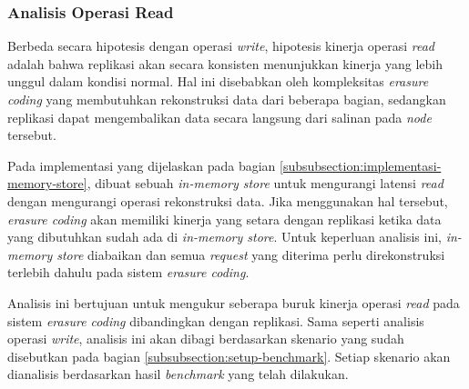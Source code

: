 
\subsubsection{Analisis Operasi Read}
\label{subsubsection:analisis-operasi-read}

Berbeda secara hipotesis dengan operasi \textit{write}, hipotesis kinerja operasi \textit{read} adalah bahwa replikasi akan secara konsisten menunjukkan kinerja yang lebih unggul dalam kondisi normal. Hal ini disebabkan oleh kompleksitas \textit{erasure coding} yang membutuhkan rekonstruksi data dari beberapa bagian, sedangkan replikasi dapat mengembalikan data secara langsung dari salinan pada \textit{node} tersebut.

Pada implementasi yang dijelaskan pada bagian \ref{subsubsection:implementasi-memory-store}, dibuat sebuah \textit{in-memory store} untuk mengurangi latensi \textit{read} dengan mengurangi operasi rekonstruksi data. Jika menggunakan hal tersebut, \textit{erasure coding} akan memiliki kinerja yang setara dengan replikasi ketika data yang dibutuhkan sudah ada di \textit{in-memory store}. Untuk keperluan analisis ini, \textit{in-memory store} diabaikan dan semua \textit{request} yang diterima perlu direkonstruksi terlebih dahulu pada sistem \textit{erasure coding}.

Analisis ini bertujuan untuk mengukur seberapa buruk kinerja operasi \textit{read} pada sistem \textit{erasure coding} dibandingkan dengan replikasi. Sama seperti analisis operasi \textit{write}, analisis ini akan dibagi berdasarkan skenario yang sudah disebutkan pada bagian \ref{subsubsection:setup-benchmark}. Setiap skenario akan dianalisis berdasarkan hasil \textit{benchmark} yang telah dilakukan.

